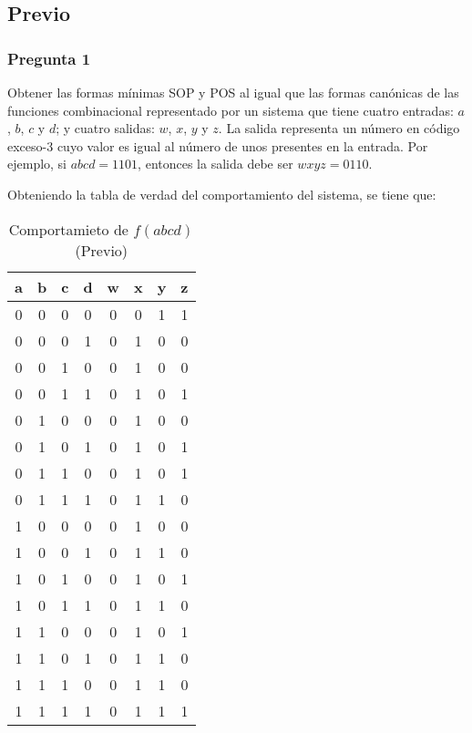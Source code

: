 \documentclass[../procedimientos.tex]{subfiles}
\begin{document}
\subsection{Previo}
\subsubsection*{Pregunta 1}
\begin{em}
  Obtener las formas mínimas SOP y POS al igual que las formas canónicas de 
  las funciones combinacional representado por un sistema que tiene cuatro 
  entradas: $a$, $b$, $c$ y $d$; y cuatro salidas: $w$, $x$, $y$ y $z$. La 
  salida representa un número en código exceso-3 cuyo valor es igual al número 
  de unos presentes en la entrada. Por ejemplo, si $abcd = 1101$, entonces la 
  salida debe ser $wxyz = 0110$.
\end{em}

Obteniendo la tabla de verdad del comportamiento del sistema, se tiene que:
\begin{table}[H]
  \centering
  \begin{tabular}{cccc|cccc}
    \hline
    \textbf{a} & \textbf{b} & \textbf{c} & \textbf{d} & \textbf{w} & 
    \textbf{x} & \textbf{y} & \textbf{z}\\
    \hline
    0	& 0	& 0	& 0	& 0	& 0	& 1	& 1\\
    0	& 0	& 0	& 1	& 0	& 1	& 0	& 0\\
    0	& 0	& 1	& 0	& 0	& 1	& 0	& 0\\
    0	& 0	& 1	& 1	& 0	& 1	& 0	& 1\\
    0	& 1	& 0	& 0	& 0	& 1	& 0	& 0\\
    0	& 1	& 0	& 1	& 0	& 1	& 0	& 1\\
    0	& 1	& 1	& 0	& 0	& 1	& 0	& 1\\
    0	& 1	& 1	& 1	& 0	& 1	& 1	& 0\\
    1	& 0	& 0	& 0	& 0	& 1	& 0	& 0\\
    1	& 0	& 0	& 1	& 0	& 1	& 1	& 0\\
    1	& 0	& 1	& 0	& 0	& 1	& 0	& 1\\
    1	& 0	& 1	& 1	& 0	& 1	& 1	& 0\\
    1	& 1	& 0	& 0	& 0	& 1	& 0	& 1\\
    1	& 1	& 0	& 1	& 0	& 1	& 1	& 0\\
    1	& 1	& 1	& 0	& 0	& 1	& 1	& 0\\
    1	& 1	& 1	& 1	& 0	& 1	& 1	& 1\\
    \hline
  \end{tabular}
  \caption{Comportamieto de $f(abcd)$ (Previo)}
  \label{tab:previo_1}
\end{table}
\end{document}
